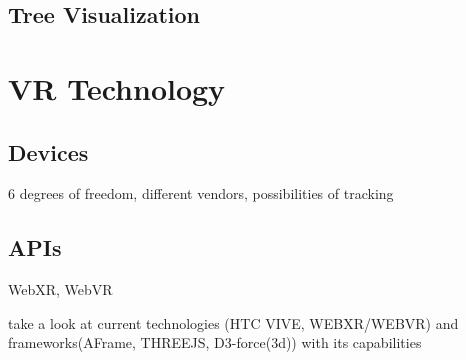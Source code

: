 \subsection{Tree Visualization}

\section{VR Technology}

\subsection{Devices}
6 degrees of freedom, different vendors, possibilities of tracking 

\subsection{APIs}
WebXR, WebVR

take a look at current technologies (HTC VIVE, WEBXR/WEBVR) and frameworks(AFrame, THREEJS, D3-force(3d)) with its capabilities
